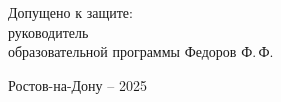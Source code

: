 \begin{singlespacing}
\begin{center}
        \vspace{15mm}

        \noindent
        \begin{flushleft}
            Допущено к защите:\\
            руководитель \\
            образовательной программы \underline{\hspace*{65mm}} Федоров Ф.\,Ф.
        \end{flushleft}




        \vfill
        Ростов-на-Дону -- 2025

    \end{center}

    \singlespacing
\end{singlespacing}